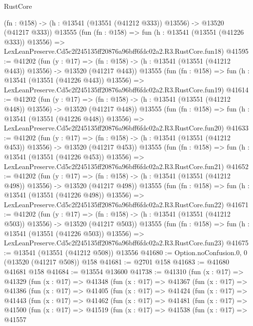 \begin{lexlean}{RustCore}
\begin{coremodule}
    (fn : @158) -> (h : @13541 (@13551 (@41212 @333)) @13556) -> @13520 (@41217 @333))
    @13555
    (fun (fn : @158) =>
    fun (h : @13541 (@13551 (@41226 @333)) @13556) =>
    LexLeanPreserve.Cd5c2f245135ff20876a96bff6fdc02a2.R3.RustCore.fun18)
@41595 := @41202
    (fun (y : @17) =>
    (fn : @158) -> (h : @13541 (@13551 (@41212 @443)) @13556) -> @13520 (@41217 @443))
    @13555
    (fun (fn : @158) =>
    fun (h : @13541 (@13551 (@41226 @443)) @13556) =>
    LexLeanPreserve.Cd5c2f245135ff20876a96bff6fdc02a2.R3.RustCore.fun19)
@41614 := @41202
    (fun (y : @17) =>
    (fn : @158) -> (h : @13541 (@13551 (@41212 @448)) @13556) -> @13520 (@41217 @448))
    @13555
    (fun (fn : @158) =>
    fun (h : @13541 (@13551 (@41226 @448)) @13556) =>
    LexLeanPreserve.Cd5c2f245135ff20876a96bff6fdc02a2.R3.RustCore.fun20)
@41633 := @41202
    (fun (y : @17) =>
    (fn : @158) -> (h : @13541 (@13551 (@41212 @453)) @13556) -> @13520 (@41217 @453))
    @13555
    (fun (fn : @158) =>
    fun (h : @13541 (@13551 (@41226 @453)) @13556) =>
    LexLeanPreserve.Cd5c2f245135ff20876a96bff6fdc02a2.R3.RustCore.fun21)
@41652 := @41202
    (fun (y : @17) =>
    (fn : @158) -> (h : @13541 (@13551 (@41212 @498)) @13556) -> @13520 (@41217 @498))
    @13555
    (fun (fn : @158) =>
    fun (h : @13541 (@13551 (@41226 @498)) @13556) =>
    LexLeanPreserve.Cd5c2f245135ff20876a96bff6fdc02a2.R3.RustCore.fun22)
@41671 := @41202
    (fun (y : @17) =>
    (fn : @158) -> (h : @13541 (@13551 (@41212 @503)) @13556) -> @13520 (@41217 @503))
    @13555
    (fun (fn : @158) =>
    fun (h : @13541 (@13551 (@41226 @503)) @13556) =>
    LexLeanPreserve.Cd5c2f245135ff20876a96bff6fdc02a2.R3.RustCore.fun23)
@41675 := @13541 (@13551 (@41212 @508)) @13556
@41680 := Option.noConfusion.{0, 0} (@13520 (@41217 @508)) @158
@41681 := @2701 @158
@41683 := @41680 @41681 @158
@41684 := @13554 @13600
@41738 := @41310
    (fun (x : @17) =>
    @41329
      (fun (x : @17) =>
      @41348
        (fun (x : @17) =>
        @41367
          (fun (x : @17) =>
          @41386
            (fun (x : @17) =>
            @41405
              (fun (x : @17) =>
              @41424
                (fun (x : @17) =>
                @41443
                  (fun (x : @17) =>
                  @41462
                    (fun (x : @17) =>
                    @41481
                      (fun (x : @17) =>
                      @41500
                        (fun (x : @17) =>
                        @41519
                          (fun (x : @17) =>
                          @41538
                            (fun (x : @17) =>
                            @41557

\end{coremodule}
\end{lexlean}
